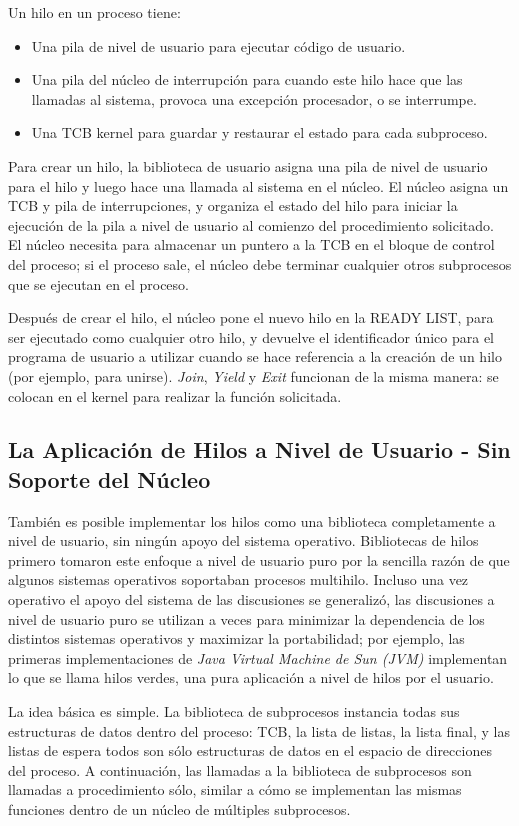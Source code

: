 \documentclass[10pt]{book}
\begin{document}
Un hilo en un proceso tiene:
\begin{itemize}
\item Una pila de nivel de usuario para ejecutar código de usuario.
\item Una pila del núcleo de interrupción para cuando este hilo hace que las llamadas al sistema, provoca una excepción procesador, o se interrumpe.
\item Una TCB kernel para guardar y restaurar el estado para cada subproceso.
\end{itemize}

Para crear un hilo, la biblioteca de usuario asigna una pila de nivel de usuario para el hilo y luego hace una llamada al sistema en el núcleo. El núcleo asigna un TCB y pila de interrupciones, y organiza el estado del hilo para iniciar la ejecución de la pila a nivel de usuario al comienzo del procedimiento solicitado. El núcleo necesita para almacenar un puntero a la TCB en el bloque de control del proceso; si el proceso sale, el núcleo debe terminar cualquier otros subprocesos que se ejecutan en el proceso.

Después de crear el hilo, el núcleo pone el nuevo hilo en la READY LIST, para ser ejecutado como cualquier otro hilo, y devuelve el identificador único para el programa de usuario a utilizar cuando se hace referencia a la creación de un hilo (por ejemplo, para unirse). \textit{Join}, \textit{Yield} y \textit{Exit} funcionan de la misma manera: se colocan en el kernel para realizar la función solicitada.

\subsection{La Aplicación de Hilos a Nivel de Usuario - Sin Soporte del Núcleo}
También es posible implementar los hilos como una biblioteca completamente a nivel de usuario, sin ningún apoyo del sistema operativo. Bibliotecas de hilos primero tomaron este enfoque a nivel de usuario puro por la sencilla razón de que algunos sistemas operativos soportaban procesos multihilo. Incluso una vez operativo el apoyo del sistema de las discusiones se generalizó, las discusiones a nivel de usuario puro se utilizan a veces para minimizar la dependencia de los distintos sistemas operativos y maximizar la portabilidad; por ejemplo, las primeras implementaciones de \textit{Java Virtual Machine de Sun (JVM)} implementan lo que se llama hilos verdes, una pura aplicación a nivel de hilos por el usuario.

La idea básica es simple. La biblioteca de subprocesos instancia todas sus estructuras de datos dentro del proceso: TCB, la lista de listas, la lista final, y las listas de espera todos son sólo estructuras de datos en el espacio de direcciones del proceso. A continuación, las llamadas a la biblioteca de subprocesos son llamadas a procedimiento sólo, similar a cómo se implementan las mismas funciones dentro de un núcleo de múltiples subprocesos.
\end{document}
